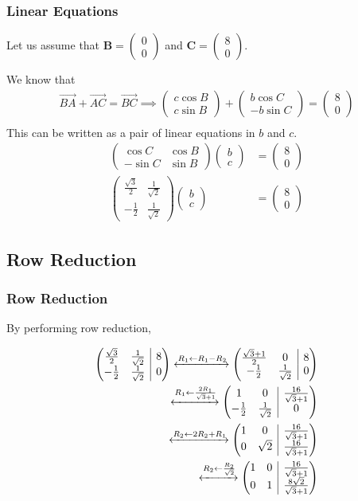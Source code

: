 \documentclass{beamer}
\makeatletter
\theoremstyle{remark}
\newcommand{\myvec}[1]{\ensuremath{\begin{pmatrix}#1\end{pmatrix}}}
\let\vec\mathbf
\numberwithin{equation}{section}
\newenvironment{amatrix}[2]{%
  \left(\begin{array}{@{}*{#1}{c}|*{#2}{c}@{}}
}{%
  \end{array}\right)
}
\newcommand{\augvec}[3]{\ensuremath{\begin{amatrix}{#1}{#2}#3\end{amatrix}}}
\makeatother
\begin{document}
\begin{frame}
\frametitle{Linear Equations}

Let us assume that $\vec{B} = \myvec{0 \\ 0}$ and $\vec{C} = \myvec{8 \\ 0}$.

We know that
\begin{align}
    \overrightarrow{BA} + \overrightarrow{AC} = \overrightarrow{BC} \implies
    \myvec{c \cos B \\ c \sin B} + \myvec{b \cos C \\ -b \sin C} = \myvec{8 \\ 0} \\
\end{align}
This can be written as a pair of linear equations in $b$ and $c$.
\begin{align} 
    \myvec{\cos C & \cos B \\ -\sin C & \sin B} \myvec{b \\ c} &= \myvec{8 \\ 0} \\
    \myvec{
        \frac{\sqrt{3}}{2} & \frac{1}{\sqrt{2}} \\
        -\frac{1}{2} & \frac{1}{\sqrt{2}}
    } \myvec{b \\ c} &= \myvec{8 \\ 0}
\end{align}
\end{frame}

\subsection{Row Reduction}
\begin{frame}

\frametitle{Row Reduction}

By performing row reduction,

\begin{align}
    \augvec{2}{1}{
        \frac{\sqrt{3}}{2} & \frac{1}{\sqrt{2}} & 8 \\
        -\frac{1}{2} & \frac{1}{\sqrt{2}} & 0
    }
    \xleftrightarrow[]{R_1 \leftarrow R_1-R_2}
    \augvec{2}{1}{
        \frac{\sqrt{3} + 1}{2} & 0 & 8 \\
        -\frac{1}{2} & \frac{1}{\sqrt{2}} & 0
    } \\
    \xleftrightarrow[]{R_1 \leftarrow \frac{2R_1}{\sqrt{3} + 1}}
    \augvec{2}{1}{
        1 & 0 & \frac{16}{\sqrt{3} + 1} \\
        -\frac{1}{2} & \frac{1}{\sqrt{2}} & 0
    } \\
    \xleftrightarrow[]{R_2 \leftarrow 2R_2 + R_1}
    \augvec{2}{1}{
        1 & 0 & \frac{16}{\sqrt{3} + 1} \\
        0 & \sqrt{2} & \frac{16}{\sqrt{3} + 1}
    } \\
    \xleftrightarrow[]{R_2 \leftarrow \frac{R_2}{\sqrt{2}}}
    \augvec{2}{1}{
        1 & 0 & \frac{16}{\sqrt{3} + 1} \\
        0 & 1 & \frac{8\sqrt{2}}{\sqrt{3} + 1}
    }
\end{align}
\end{frame}
\end{document}
